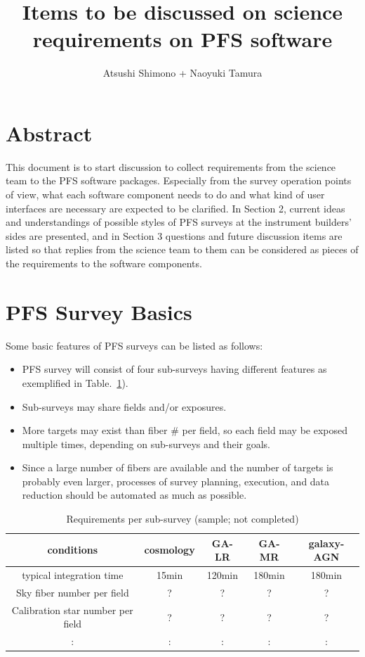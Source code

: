 \documentclass[a4paper,notitlepage]{article}
\title{Items to be discussed on science requirements on PFS software}
\author{Atsushi Shimono + Naoyuki Tamura}
\begin{document}

\ssnhead

\section{Abstract}

This document is to start discussion to collect requirements from the
science team to the PFS software packages. Especially from the survey
operation points of view, what each software component needs to do and
what kind of user interfaces are necessary are expected to be
clarified. In Section 2, current ideas and understandings of possible
styles of PFS surveys at the instrument builders' sides are presented,
and in Section 3 questions and future discussion items are listed so
that replies from the science team to them can be considered as pieces
of the requirements to the software components.

\section{PFS Survey Basics}

Some basic features of PFS surveys can be listed as follows:
\begin{itemize}
 \item PFS survey will consist of four sub-surveys having different
       features as exemplified in
       Table.~\ref{tab:sciops-scireq-subsvy}).
 \item Sub-surveys may share fields and/or exposures.
 \item More targets may exist than fiber \# per field, so each field
       may be exposed multiple times, depending on sub-surveys and
       their goals.
 \item Since a large number of fibers are available and the number of
       targets is probably even larger, processes of survey planning,
       execution, and data reduction should be automated as much as
       possible.
\end{itemize}

\begin{table}[htb]
\caption{Requirements per sub-survey (sample; not completed)}
\label{tab:sciops-scireq-subsvy}
\begin{center}
\begin{tabular}{c|c|c|c|c}
conditions & cosmology & GA-LR & GA-MR & galaxy-AGN \\
\hline
\hline
typical integration time & 15min & 120min & 180min & 180min \\
\hline
Sky fiber number per field & ? & ? & ? & ? \\
\hline
Calibration star number per field & ? & ? & ? & ? \\
\hline
 : & : & : & : & : \\
\end{tabular}
\end{center}
\end{table}
\end{document}
